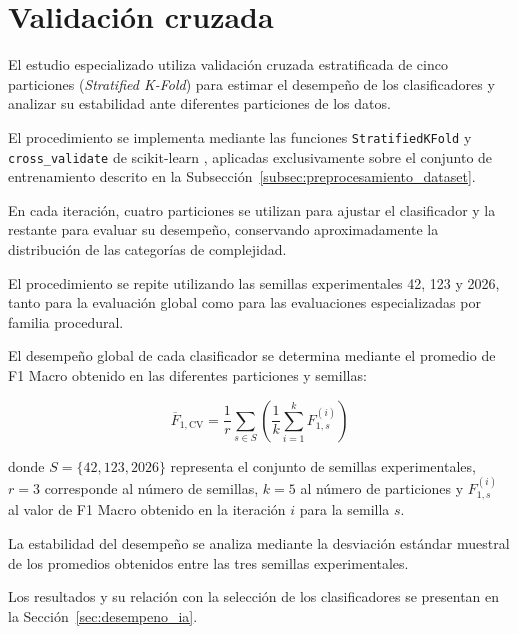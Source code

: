 \FloatBarrier


\section{Validación cruzada}
\label{sec:validacion_cruzada_ia}

El estudio especializado utiliza validación cruzada estratificada de cinco particiones (\textit{Stratified K-Fold}) para estimar el desempeño de los clasificadores y analizar su estabilidad ante diferentes particiones de los datos.

El procedimiento se implementa mediante las funciones \texttt{StratifiedKFold} y \texttt{cross\_validate} de scikit-learn \parencite{pedregosa2011}, aplicadas exclusivamente sobre el conjunto de entrenamiento descrito en la Subsección~\ref{subsec:preprocesamiento_dataset}.

En cada iteración, cuatro particiones se utilizan para ajustar el clasificador y la restante para evaluar su desempeño, conservando aproximadamente la distribución de las categorías de complejidad.

El procedimiento se repite utilizando las semillas experimentales 42, 123 y 2026, tanto para la evaluación global como para las evaluaciones especializadas por familia procedural.

El desempeño global de cada clasificador se determina mediante el promedio de F1 Macro obtenido en las diferentes particiones y semillas:

\begin{equation}
	\overline{F}_{1,\mathrm{CV}}
	=
	\frac{1}{r}
	\sum_{s \in S}
	\left(
	\frac{1}{k}
	\sum_{i=1}^{k}F_{1,s}^{(i)}
	\right)
	\label{eq:f1_cv_global}
\end{equation}

donde $S=\{42,123,2026\}$ representa el conjunto de semillas experimentales, $r=3$ corresponde al número de semillas, $k=5$ al número de particiones y $F_{1,s}^{(i)}$ al valor de F1 Macro obtenido en la iteración $i$ para la semilla $s$.

La estabilidad del desempeño se analiza mediante la desviación estándar muestral de los promedios obtenidos entre las tres semillas experimentales.

Los resultados y su relación con la selección de los clasificadores se presentan en la Sección~\ref{sec:desempeno_ia}.

